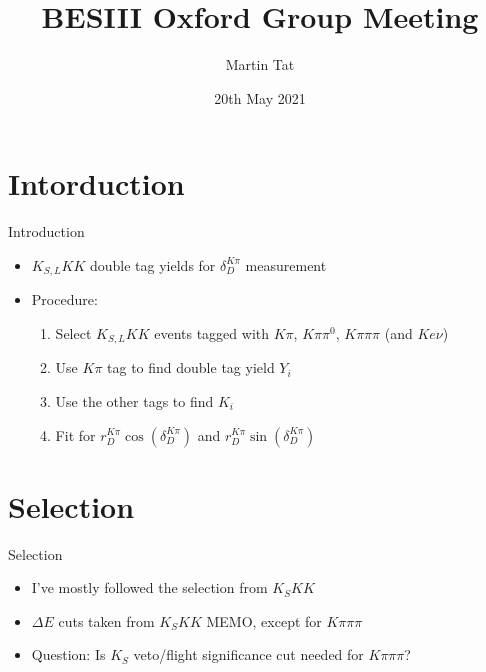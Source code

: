 \documentclass{beamer}
\title[BESIII Oxford]{BESIII Oxford Group Meeting}
\author{Martin Tat}
\institute{Oxford LHCb}
\date{20th May 2021}
\begin{document}
\begin{frame}
  \titlepage
\end{frame}


\section{Intorduction}
\begin{frame}{Introduction}
  \begin{itemize}
    \setlength\itemsep{2em}
    \item{$K_{S, L}KK$ double tag yields for $\delta_D^{K\pi}$ measurement}
    \item{Procedure:}
    \begin{enumerate}
      \item{Select $K_{S, L}KK$ events tagged with $K\pi$, $K\pi\pi^0$, $K\pi\pi\pi$ (and $Ke\nu$)}
      \item{Use $K\pi$ tag to find double tag yield $Y_i$}
      \item{Use the other tags to find $K_i$}
      \item{Fit for $r_D^{K\pi}\cos(\delta_D^{K\pi})$ and $r_D^{K\pi}\sin(\delta_D^{K\pi})$}
    \end{enumerate}
  \end{itemize}
\end{frame}

\section{Selection}
\begin{frame}{Selection}
  \begin{itemize}
    \setlength\itemsep{2em}
    \item{I've mostly followed the selection from $K_SKK$}
    \item{$\Delta E$ cuts taken from $K_SKK$ MEMO, except for $K\pi\pi\pi$}
    \item{Question: Is $K_S$ veto/flight significance cut needed for $K\pi\pi\pi$?}
  \end{itemize}
\end{frame}
\end{document}
